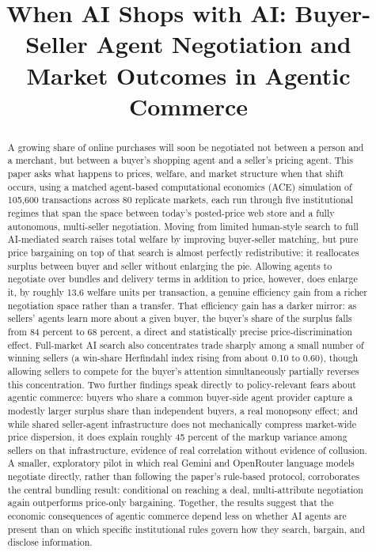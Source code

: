 \documentclass[review]{elsarticle}
\begin{document}
\begin{frontmatter}

\title{When AI Shops with AI: Buyer-Seller Agent Negotiation and Market Outcomes in Agentic Commerce}


\begin{abstract}
A growing share of online purchases will soon be negotiated not between a person and a merchant, but between a buyer's shopping agent and a seller's pricing agent. This paper asks what happens to prices, welfare, and market structure when that shift occurs, using a matched agent-based computational economics (ACE) simulation of 105,600 transactions across 80 replicate markets, each run through five institutional regimes that span the space between today's posted-price web store and a fully autonomous, multi-seller negotiation. Moving from limited human-style search to full AI-mediated search raises total welfare by improving buyer-seller matching, but pure price bargaining on top of that search is almost perfectly redistributive: it reallocates surplus between buyer and seller without enlarging the pie. Allowing agents to negotiate over bundles and delivery terms in addition to price, however, does enlarge it, by roughly 13.6 welfare units per transaction, a genuine efficiency gain from a richer negotiation space rather than a transfer. That efficiency gain has a darker mirror: as sellers' agents learn more about a given buyer, the buyer's share of the surplus falls from 84 percent to 68 percent, a direct and statistically precise price-discrimination effect. Full-market AI search also concentrates trade sharply among a small number of winning sellers (a win-share Herfindahl index rising from about 0.10 to 0.60), though allowing sellers to compete for the buyer's attention simultaneously partially reverses this concentration. Two further findings speak directly to policy-relevant fears about agentic commerce: buyers who share a common buyer-side agent provider capture a modestly larger surplus share than independent buyers, a real monopsony effect; and while shared seller-agent infrastructure does not mechanically compress market-wide price dispersion, it does explain roughly 45 percent of the markup variance among sellers on that infrastructure, evidence of real correlation without evidence of collusion. A smaller, exploratory pilot in which real Gemini and OpenRouter language models negotiate directly, rather than following the paper's rule-based protocol, corroborates the central bundling result: conditional on reaching a deal, multi-attribute negotiation again outperforms price-only bargaining. Together, the results suggest that the economic consequences of agentic commerce depend less on whether AI agents are present than on which specific institutional rules govern how they search, bargain, and disclose information.
\end{abstract}


\end{frontmatter}
\end{document}
